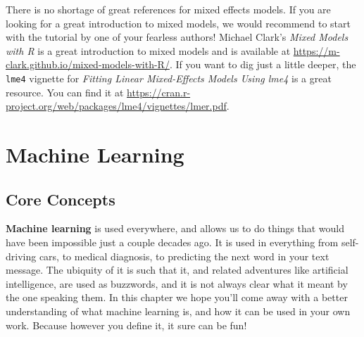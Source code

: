\documentclass[
  letterpaper,
]{krantz}
\begin{document}
There is no shortage of great references for mixed effects models. If
you are looking for a great introduction to mixed models, we would
recommend to start with the tutorial by one of your fearless authors!
Michael Clark's \emph{Mixed Models with R} is a great introduction to
mixed models and is available at
\url{https://m-clark.github.io/mixed-models-with-R/}. If you want to dig
just a little deeper, the \texttt{lme4} vignette for \emph{Fitting
Linear Mixed-Effects Models Using lme4} is a great resource. You can
find it at
\url{https://cran.r-project.org/web/packages/lme4/vignettes/lmer.pdf}.

\part{Machine Learning}

\chapter{Core Concepts}\label{sec-core-concepts}

\textbf{Machine learning} is used everywhere, and allows us to do things
that would have been impossible just a couple decades ago. It is used in
everything from self-driving cars, to medical diagnosis, to predicting
the next word in your text message. The ubiquity of it is such that it,
and related adventures like artificial intelligence, are used as
buzzwords, and it is not always clear what it meant by the one speaking
them. In this chapter we hope you'll come away with a better
understanding of what machine learning is, and how it can be used in
your own work. Because however you define it, it sure can be fun!
\end{document}
